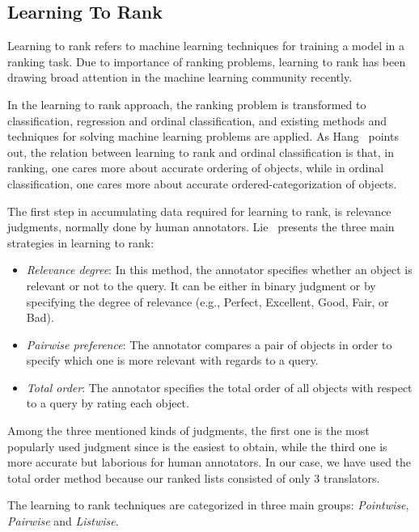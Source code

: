 \subsection{Learning To Rank}
Learning to rank refers to machine learning techniques for training a model in a ranking task. Due to importance of ranking problems, learning to rank has been drawing broad attention in the machine learning community recently. 

In the learning to rank approach, the ranking problem is transformed to classification, regression and ordinal classification, and existing methods and techniques for solving machine learning problems are applied. As Hang~\cite{l2r-intro} points out, the relation between learning to rank and ordinal classification is that, in ranking, one cares more about accurate ordering of objects, while in ordinal classification, one cares more about accurate ordered-categorization of objects.

The first step in accumulating data required for learning to rank, is relevance judgments, normally done by human annotators. Lie~\cite{l2r-book} presents the three main strategies in learning to rank:
\begin{itemize}
\vspace{-0.2cm}
\item \textit{Relevance degree}: In this method, the annotator specifies whether an object is relevant or not to the query. It can be either in binary judgment or by specifying the degree of relevance (e.g., Perfect, Excellent, Good, Fair, or Bad).
\item \textit{Pairwise preference}: The annotator compares a pair of objects in order to specify which one is more relevant with regards to a query.
\item \textit{Total order}: The annotator specifies the total order of all objects with respect to a query by rating each object.
\vspace{-0.2cm}
\end{itemize}

Among the three mentioned kinds of judgments, the first one is the most popularly used judgment since is the easiest to obtain, while the third one is more accurate but laborious for human annotators. In our case, we have used the total order method because our ranked lists consisted of only 3 translators.

The learning to rank techniques are categorized in three main groups: \textit{Pointwise}, \textit{Pairwise} and \textit{Listwise}.

